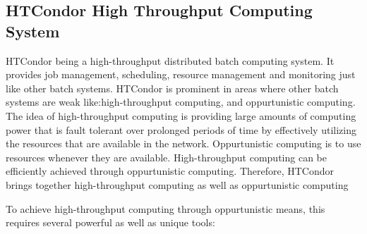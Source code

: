 \documentclass[9pt,twocolumn,twoside]{styles/osajnl}
\begin{document}
\subsection{HTCondor High Throughput Computing System}
HTCondor being a high-throughput distributed batch computing system.
It provides job management, scheduling, resource management and
monitoring just like other batch systems. HTCondor is prominent in
areas where other batch systems are weak like:high-throughput
computing, and oppurtunistic computing. The idea of high-throughput
computing is providing large amounts of computing power that is fault
tolerant over prolonged periods of time by effectively utilizing the
resources that are available in the network. Oppurtunistic computing
is to use resources whenever they are available. High-throughput
computing can be efficiently achieved through oppurtunistic
computing. Therefore, HTCondor brings together high-throughput
computing as well as oppurtunistic computing

To achieve high-throughput computing through oppurtunistic means, this
requires several powerful as well as unique tools:
\end{document}
